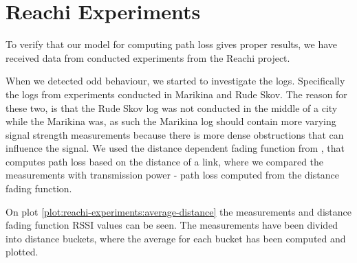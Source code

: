 \section{Reachi Experiments}\label{sec:linkmodel}
To verify that our model for computing path loss gives proper results, we have received data from conducted experiments from the Reachi project.

When we detected odd behaviour, we started to investigate the logs. Specifically the logs from experiments
conducted in Marikina and Rude Skov. The reason for these two, is that the Rude Skov log was not conducted in
the middle of a city while the Marikina was, as such the Marikina log should contain more varying signal
strength measurements because there is more dense obstructions that can influence the signal. We used the
distance dependent fading function from \cite{paper:linkmodel}, that computes path loss based on the distance
of a link, where we compared the measurements with transmission power - path loss computed from the distance
fading function.

On plot \ref{plot:reachi-experiments:average-distance} the measurements and distance fading function RSSI
values can be seen. The measurements have been divided into distance buckets, where the average for each
bucket has been computed and plotted.


